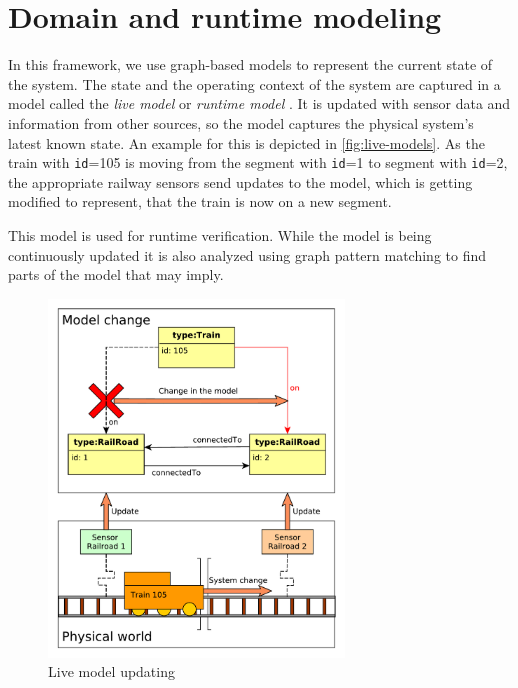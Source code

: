 \section{Domain and runtime modeling}

In this framework, we use graph-based models to represent the current state of the system. 
The state and the operating context of the system are captured in a model called the \emph{live model} or \emph{runtime model} \cite{Szvetits2013, DBLP:journals/computer/BlairBF09}.
It is updated with sensor data and information from other sources, so the model captures the physical system's latest known state.
An example for this is depicted in \autoref{fig:live-models}. As the train with \texttt{id}=105 is moving from the segment with \texttt{id}=1 to segment with \texttt{id}=2, the appropriate railway sensors send updates to the model, which is getting modified to represent, that the train is now on a new segment.


This model is used for runtime verification.
While the model is being continuously updated it is also analyzed using graph pattern matching to find parts of the model that may imply.


\begin{figure}[H]
	\begin{center}
		\includegraphics[width=0.7\textwidth]{figures/live-models.pdf}
		\caption{Live model updating}
		\label{fig:live-models}
	\end{center}
\end{figure}

